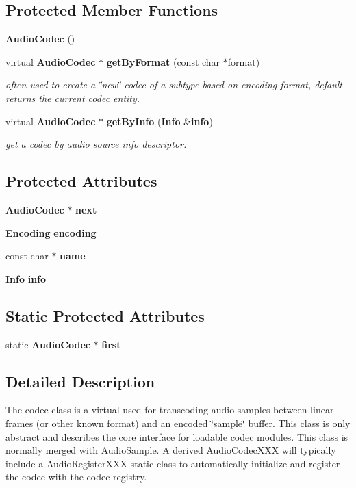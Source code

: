 \subsection*{Protected Member Functions}
\begin{DoxyCompactItemize}
\item 
{\bf AudioCodec} ()
\item 
virtual {\bf AudioCodec} $\ast$ {\bf getByFormat} (const char $\ast$format)
\begin{DoxyCompactList}\small\item\em often used to create a \char`\"{}new\char`\"{} codec of a subtype based on encoding format, default returns the current codec entity. \item\end{DoxyCompactList}\item 
virtual {\bf AudioCodec} $\ast$ {\bf getByInfo} ({\bf Info} \&{\bf info})
\begin{DoxyCompactList}\small\item\em get a codec by audio source info descriptor. \item\end{DoxyCompactList}\end{DoxyCompactItemize}
\subsection*{Protected Attributes}
\begin{DoxyCompactItemize}
\item 
{\bf AudioCodec} $\ast$ {\bf next}
\item 
{\bf Encoding} {\bf encoding}
\item 
const char $\ast$ {\bf name}
\item 
{\bf Info} {\bf info}
\end{DoxyCompactItemize}
\subsection*{Static Protected Attributes}
\begin{DoxyCompactItemize}
\item 
static {\bf AudioCodec} $\ast$ {\bf first}
\end{DoxyCompactItemize}


\subsection{Detailed Description}
The codec class is a virtual used for transcoding audio samples between linear frames (or other known format) and an encoded \char`\"{}sample\char`\"{} buffer. This class is only abstract and describes the core interface for loadable codec modules. This class is normally merged with AudioSample. A derived AudioCodecXXX will typically include a AudioRegisterXXX static class to automatically initialize and register the codec with the codec registry.

